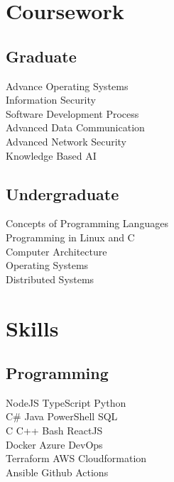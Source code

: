 \documentclass[]{deedy-resume-openfont}
\begin{document}
\begin{minipage}[t]{0.33\textwidth}

\section{Coursework}
\subsection{Graduate}
Advance Operating Systems \\
Information Security \\
Software Development Process \\
Advanced Data Communication \\
Advanced Network Security \\
Knowledge Based AI
\sectionsep
\subsection{Undergraduate}
Concepts of Programming Languages \\
Programming in Linux and C \\
Computer Architecture \\
Operating Systems \\
Distributed Systems
\sectionsep


\section{Skills}
\subsection{Programming}

NodeJS \textbullet{} TypeScript \textbullet{}  Python \\
C\# \textbullet{} Java \textbullet{} PowerShell \textbullet{} SQL \\
C \textbullet{} C++ \textbullet{} Bash \textbullet{} ReactJS \\

Docker \textbullet{} Azure DevOps  \\
Terraform \textbullet{} AWS Cloudformation \\
Ansible \textbullet{} Github Actions \\


\end{minipage}
\end{document}
